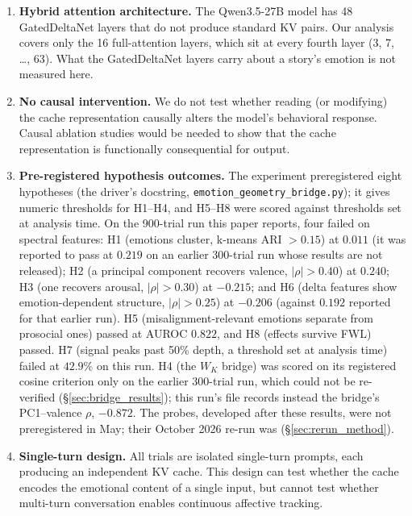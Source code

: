\begin{enumerate}[nosep]
    \item \textbf{Hybrid attention architecture.} The Qwen3.5-27B model has 48 GatedDeltaNet layers that do not produce standard KV pairs. Our analysis covers only the 16 full-attention layers, which sit at every fourth layer (3, 7, \ldots, 63). What the GatedDeltaNet layers carry about a story's emotion is not measured here.

    \item \textbf{No causal intervention.} We do not test whether reading (or modifying) the cache representation causally alters the model's behavioral response. Causal ablation studies would be needed to show that the cache representation is functionally consequential for output.

    \item \textbf{Pre-registered hypothesis outcomes.} The experiment preregistered eight hypotheses (the driver's docstring, \texttt{emotion\_geometry\_bridge.py}); it gives numeric thresholds for H1--H4, and H5--H8 were scored against thresholds set at analysis time. On the 900-trial run this paper reports, four failed on spectral features: H1 (emotions cluster, k-means ARI $> 0.15$) at $0.011$ (it was reported to pass at $0.219$ on an earlier 300-trial run whose results are not released); H2 (a principal component recovers valence, $|\rho| > 0.40$) at $0.240$; H3 (one recovers arousal, $|\rho| > 0.30$) at $-0.215$; and H6 (delta features show emotion-dependent structure, $|\rho| > 0.25$) at $-0.206$ (against $0.192$ reported for that earlier run). H5 (misalignment-relevant emotions separate from prosocial ones) passed at AUROC $0.822$, and H8 (effects survive FWL) passed. H7 (signal peaks past 50\% depth, a threshold set at analysis time) failed at $42.9\%$ on this run. H4 (the $W_K$ bridge) was scored on its registered cosine criterion only on the earlier 300-trial run, which could not be re-verified (\S\ref{sec:bridge_results}); this run's file records instead the bridge's PC1--valence $\rho$, $-0.872$. The probes, developed after these results, were not preregistered in May; their October 2026 re-run was (\S\ref{sec:rerun_method}).

    \item \textbf{Single-turn design.} All trials are isolated single-turn prompts, each producing an independent KV cache. This design can test whether the cache encodes the emotional content of a single input, but cannot test whether multi-turn conversation enables continuous affective tracking.
\end{enumerate}

